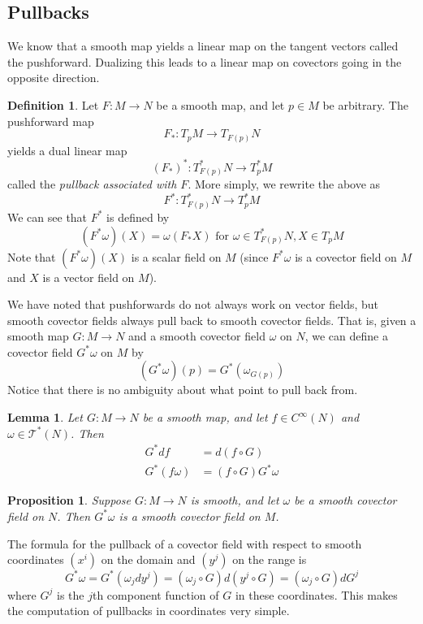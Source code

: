 \documentclass{article}
\newtheorem{proposition}[theorem]{Proposition}
\newtheorem{lemma}[theorem]{Lemma}
\theoremstyle{remark}
\theoremstyle{definition}
\newtheorem{definition}{Definition}[section]
\begin{document}
  \subsection{Pullbacks}

    We know that a smooth map yields a linear map on the tangent vectors called the pushforward. Dualizing this leads to a linear map on covectors going in the opposite direction. 

    \begin{definition}
    Let $F: M \longrightarrow N$ be a smooth map, and let $p \in M$ be arbitrary. The pushforward map
    \[F_* :T_p M \longrightarrow T_{F(p)} N\]
    yields a dual linear map 
    \[(F_*)^* : T_{F(p)}^* N \longrightarrow T_p^* M\]
    called the \textit{pullback associated with $F$}. More simply, we rewrite the above as
    \[F^*:T_{F(p)}^* N \longrightarrow T_p^* M\]
    We can see that $F^*$ is defined by 
    \[(F^* \omega)(X) = \omega (F_* X) \text{ for } \omega \in T^*_{F(p)} N, X \in T_p M\]
    Note that $(F^* \omega)(X)$ is a scalar field on $M$ (since $F^* \omega$ is a covector field on $M$ and $X$ is a vector field on $M$). 
    \end{definition}

    We have noted that pushforwards do not always work on vector fields, but smooth covector fields always pull back to smooth covector fields. That is, given a smooth map $G: M \longrightarrow N$ and a smooth covector field $\omega$ on $N$, we can define a covector field $G^* \omega$ on $M$ by 
    \[(G^* \omega) (p) = G^* (\omega_{G(p)})\]
    Notice that there is no ambiguity about what point to pull back from. 

    \begin{lemma}
    Let $G: M \longrightarrow N$ be a smooth map, and let $f \in C^\infty(N)$ and $\omega \in \mathcal{T}^* (N)$. Then 
    \begin{align*}
        G^* df & = d (f \circ G) \\
        G^* (f \omega) & = (f \circ G) G^* \omega 
    \end{align*}
    \end{lemma}

    \begin{proposition}
    Suppose $G: M \longrightarrow N$ is smooth, and let $\omega$ be a smooth covector field on $N$. Then $G^* \omega$ is a smooth covector field on $M$. 
    \end{proposition}

    The formula for the pullback of a covector field with respect to smooth coordinates $(x^i)$ on the domain and $(y^j)$ on the range is
    \[G^* \omega = G^* (\omega_j dy^j) = (\omega_j \circ G) d(y^j \circ G) = (\omega_j \circ G) dG^j\]
    where $G^j$ is the $j$th component function of $G$ in these coordinates. This makes the computation of pullbacks in coordinates very simple. 
\end{document}
